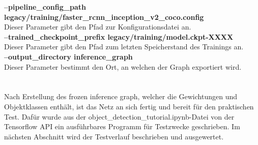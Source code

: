 \documentclass[a4paper,12pt,oneside]{article}
\begin{document}
\textbf{--pipeline\_config\_path legacy/training/faster\_rcnn\_inception\_v2\_coco.config}\\
Dieser Parameter gibt den Pfad zur Konfigurationsdatei an.\\
\textbf{--trained\_checkpoint\_prefix legacy/training/model.ckpt-XXXX}\\
Dieser Parameter gibt den Pfad zum letzten Speicherstand des Trainings an.\\
\textbf{--output\_directory inference\_graph}\\
Dieser Parameter bestimmt den Ort, an welchen der Graph exportiert wird.\\\\\\
Nach Erstellung des \glqq frozen inference graph\grqq , welcher die Gewichtungen und Objektklassen enthält, ist das Netz an sich fertig und bereit für den praktischen Test. Dafür wurde aus der object\_detection\_tutorial.ipynb-Datei von der Tensorflow API ein ausführbares Programm für Testzwecke geschrieben. Im nächsten Abschnitt wird der Testverlauf beschrieben und ausgewertet.
  
\newpage
\end{document}
